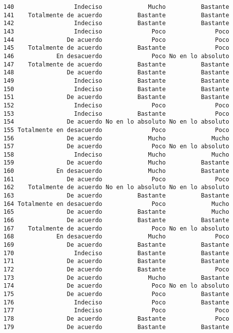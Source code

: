 \documentclass[
  letterpaper,
  DIV=11,
  numbers=noendperiod]{scrartcl}
\begin{document}
\begin{verbatim}
140                 Indeciso             Mucho          Bastante
141    Totalmente de acuerdo          Bastante          Bastante
142                 Indeciso          Bastante          Bastante
143                 Indeciso              Poco              Poco
144               De acuerdo              Poco              Poco
145    Totalmente de acuerdo          Bastante              Poco
146            En desacuerdo              Poco No en lo absoluto
147    Totalmente de acuerdo          Bastante          Bastante
148               De acuerdo          Bastante          Bastante
149                 Indeciso          Bastante          Bastante
150                 Indeciso          Bastante          Bastante
151               De acuerdo          Bastante          Bastante
152                 Indeciso              Poco              Poco
153                 Indeciso          Bastante              Poco
154               De acuerdo No en lo absoluto No en lo absoluto
155 Totalmente en desacuerdo              Poco              Poco
156               De acuerdo             Mucho             Mucho
157               De acuerdo              Poco No en lo absoluto
158                 Indeciso             Mucho             Mucho
159               De acuerdo             Mucho          Bastante
160            En desacuerdo             Mucho          Bastante
161               De acuerdo              Poco              Poco
162    Totalmente de acuerdo No en lo absoluto No en lo absoluto
163               De acuerdo          Bastante          Bastante
164 Totalmente en desacuerdo              Poco             Mucho
165               De acuerdo          Bastante             Mucho
166               De acuerdo          Bastante          Bastante
167    Totalmente de acuerdo              Poco No en lo absoluto
168            En desacuerdo             Mucho              Poco
169               De acuerdo          Bastante          Bastante
170                 Indeciso          Bastante          Bastante
171               De acuerdo          Bastante          Bastante
172               De acuerdo          Bastante              Poco
173               De acuerdo             Mucho          Bastante
174               De acuerdo              Poco No en lo absoluto
175               De acuerdo              Poco          Bastante
176                 Indeciso              Poco          Bastante
177                 Indeciso              Poco              Poco
178               De acuerdo          Bastante              Poco
179               De acuerdo          Bastante          Bastante

\end{verbatim}
\end{document}
